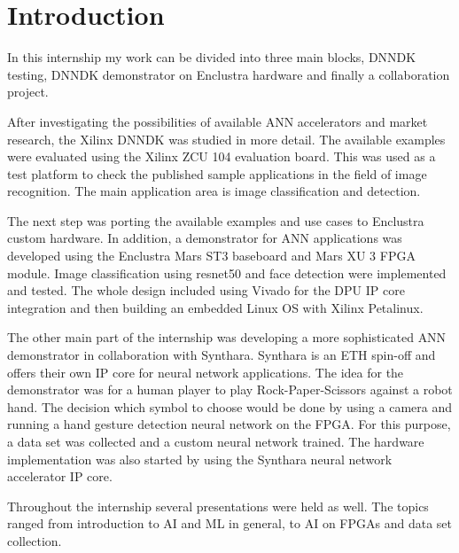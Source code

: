 \chapter{Introduction}
In this internship my work can be divided into three main blocks, \ac{DNNDK} testing, \ac{DNNDK} demonstrator on Enclustra hardware and finally a collaboration project.

After investigating the possibilities of available \ac{ANN} accelerators and market research, the Xilinx \ac{DNNDK} was studied in more detail. The available examples were evaluated using the Xilinx ZCU 104 evaluation board. This was used as a test platform to check the published sample applications in the field of image recognition. The main application area is image classification and detection.

The next step was porting the available examples and use cases to Enclustra custom hardware. In addition, a demonstrator for \ac{ANN} applications was developed using the Enclustra Mars ST3 baseboard and Mars XU 3 \ac{FPGA} module. Image classification using resnet50 and face detection were implemented and tested. The whole design included using Vivado for the \ac{DPU} \ac{IP} core integration and then building an embedded Linux \ac{OS} with Xilinx Petalinux.

The other main part of the internship was developing a more sophisticated \ac{ANN} demonstrator in collaboration with Synthara. Synthara is an ETH spin-off and offers their own \ac{IP} core for neural network applications. The idea for the demonstrator was for a human player to play Rock-Paper-Scissors against a robot hand. The decision which symbol to choose would be done by using a camera and running a hand gesture detection neural network on the \ac{FPGA}. For this purpose, a data set was collected and a custom neural network trained. The hardware implementation was also started by using the Synthara neural network accelerator \ac{IP} core.

Throughout the internship several presentations were held as well. The topics ranged from introduction to \ac{AI} and \ac{ML} in general, to \ac{AI} on \acp{FPGA} and data set collection.